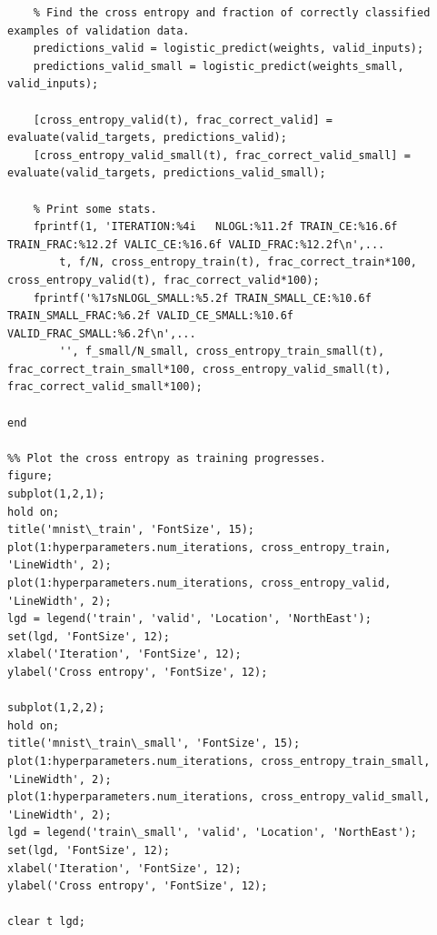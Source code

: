 \documentclass{article}
\begin{document}
\begin{lstlisting}
    % Find the cross entropy and fraction of correctly classified examples of validation data.
    predictions_valid = logistic_predict(weights, valid_inputs);
    predictions_valid_small = logistic_predict(weights_small, valid_inputs);
    
    [cross_entropy_valid(t), frac_correct_valid] = evaluate(valid_targets, predictions_valid);
    [cross_entropy_valid_small(t), frac_correct_valid_small] = evaluate(valid_targets, predictions_valid_small);
    
    % Print some stats.
    fprintf(1, 'ITERATION:%4i   NLOGL:%11.2f TRAIN_CE:%16.6f TRAIN_FRAC:%12.2f VALIC_CE:%16.6f VALID_FRAC:%12.2f\n',...
        t, f/N, cross_entropy_train(t), frac_correct_train*100, cross_entropy_valid(t), frac_correct_valid*100);
    fprintf('%17sNLOGL_SMALL:%5.2f TRAIN_SMALL_CE:%10.6f TRAIN_SMALL_FRAC:%6.2f VALID_CE_SMALL:%10.6f VALID_FRAC_SMALL:%6.2f\n',...
        '', f_small/N_small, cross_entropy_train_small(t), frac_correct_train_small*100, cross_entropy_valid_small(t), frac_correct_valid_small*100);
    
end

%% Plot the cross entropy as training progresses.
figure;
subplot(1,2,1);
hold on;
title('mnist\_train', 'FontSize', 15);
plot(1:hyperparameters.num_iterations, cross_entropy_train, 'LineWidth', 2);
plot(1:hyperparameters.num_iterations, cross_entropy_valid, 'LineWidth', 2);
lgd = legend('train', 'valid', 'Location', 'NorthEast');
set(lgd, 'FontSize', 12);
xlabel('Iteration', 'FontSize', 12);
ylabel('Cross entropy', 'FontSize', 12);

subplot(1,2,2);
hold on;
title('mnist\_train\_small', 'FontSize', 15);
plot(1:hyperparameters.num_iterations, cross_entropy_train_small, 'LineWidth', 2);
plot(1:hyperparameters.num_iterations, cross_entropy_valid_small, 'LineWidth', 2);
lgd = legend('train\_small', 'valid', 'Location', 'NorthEast');
set(lgd, 'FontSize', 12);
xlabel('Iteration', 'FontSize', 12);
ylabel('Cross entropy', 'FontSize', 12);

clear t lgd;
\end{lstlisting}
\end{document}
